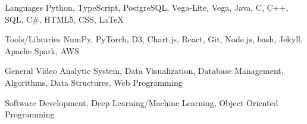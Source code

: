 

\begin{cvskills}

  \cvskill
    {Languages} %
    {Python, TypeScript, PostgreSQL, Vega-Lite, Vega, Java, C, C++, SQL, C\#, HTML5, CSS, LaTeX} %

  \cvskill
    {Tools/Libraries} %
    {NumPy, PyTorch, D3, Chart.js, React, Git, Node.js, bash, Jekyll, Apache Spark, AWS} %

  \cvskill
    {General} %
    {Video Analytic System, Data Visualization, Database Management, Algorithms, Data Structures, Web Programming} %

  \cvskill
    {} %
    {Software Development, Deep Learning/Machine Learning, Object Oriented Programming} %

\end{cvskills}